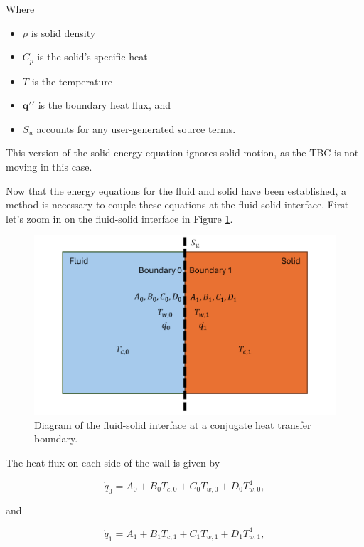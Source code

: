 \documentclass{UCF_ETD}
\begin{document}
Where

\begin{itemize}
    \item $\rho$ is solid density
    \item $C_{p}$ is the solid's specific heat
    \item $T$ is the temperature
    \item $\dot{\mathbf{q}} \prime \prime$ is the boundary heat flux, and
    \item $S_{u}$ accounts for any user-generated source terms.
\end{itemize}

This version of the solid energy equation ignores solid motion, as the TBC is not moving in this case.

Now that the energy equations for the fluid and solid have been established, a method is necessary to couple these equations at the fluid-solid interface. First let's zoom in on the fluid-solid interface in Figure \ref{fig:conjugateHT_diagram}.

\begin{figure}[htp!]
\centering
\includegraphics[width=\linewidth]{Figures/conjugateHeatTransferDiagram.png}
\caption{Diagram of the fluid-solid interface at a conjugate heat transfer boundary.}
\label{fig:conjugateHT_diagram}
\end{figure}

The heat flux on each side of the wall is given by

\begin{equation}
    \Dot{q}_{0} = A_{0} + B_{0}T_{c,0} + C_{0}T_{w,0} + D_{0}T^{4}_{w,0},
    \label{eq:q0}
\end{equation}

and 

\begin{equation}
    \Dot{q}_{1} = A_{1} + B_{1}T_{c,1} + C_{1}T_{w,1} + D_{1}T^{4}_{w,1},
    \label{eq:q1}
\end{equation}
\end{document}
